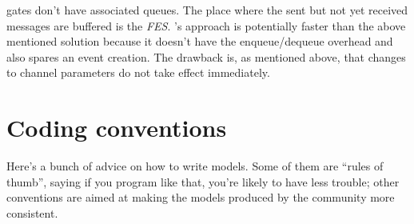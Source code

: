 {\opp} gates don't have associated queues. The place
where the sent but not yet received messages are buffered is the
\textit{FES}.  {\opp}'s approach is potentially faster
than the above mentioned solution because it doesn't have the
enqueue/dequeue overhead and also spares an event creation. The
drawback is, as mentioned above, that changes to channel parameters do
not take effect immediately.





\section{Coding conventions}

Here's a bunch of advice on how to write {\opp} models. Some
of them are ``rules of thumb'', saying if you program like that,
you're likely to have less trouble; other conventions are aimed
at making the models produced by the {\opp} community more consistent.


